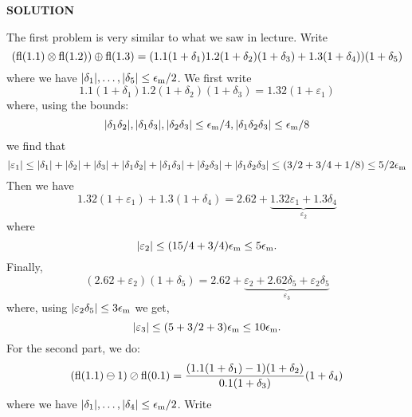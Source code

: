 \documentclass[12pt,a4paper]{article}
\begin{document}
\textbf{SOLUTION}

The first problem is very similar to what we saw in lecture. Write
\[
({\rm fl}(1.1)\ensuremath{\otimes} {\rm fl}(1.2)) \ensuremath{\oplus} {\rm fl}(1.3) = ( 1.1(1 + \ensuremath{\delta}_1)1.2(1+\ensuremath{\delta}_2)(1+\ensuremath{\delta}_3) + 1.3(1+\ensuremath{\delta}_4))(1+\ensuremath{\delta}_5)
\]
where we have $|\ensuremath{\delta}_1|,\ensuremath{\ldots},|\ensuremath{\delta}_5| \ensuremath{\leq} \ensuremath{\epsilon}_{\rm m}/2$. We first write
\[
1.1(1 + \ensuremath{\delta}_1)1.2(1+\ensuremath{\delta}_2)(1+\ensuremath{\delta}_3) = 1.32( 1+ \ensuremath{\varepsilon}_1)
\]
where, using the bounds:
\[
|\ensuremath{\delta}_1\ensuremath{\delta}_2|,|\ensuremath{\delta}_1\ensuremath{\delta}_3|,|\ensuremath{\delta}_2\ensuremath{\delta}_3| \ensuremath{\leq} \ensuremath{\epsilon}_{\rm m}/4, |\ensuremath{\delta}_1\ensuremath{\delta}_2\ensuremath{\delta}_3| \ensuremath{\leq} \ensuremath{\epsilon}_{\rm m}/8
\]
we find that
\[
|\ensuremath{\varepsilon}_1| \ensuremath{\leq} |\ensuremath{\delta}_1| + |\ensuremath{\delta}_2| + |\ensuremath{\delta}_3| + |\ensuremath{\delta}_1\ensuremath{\delta}_2| + |\ensuremath{\delta}_1\ensuremath{\delta}_3| + |\ensuremath{\delta}_2\ensuremath{\delta}_3|+ |\ensuremath{\delta}_1\ensuremath{\delta}_2\ensuremath{\delta}_3| 
     \ensuremath{\leq} (3/2 + 3/4 + 1/8) \ensuremath{\leq} 5/2 \ensuremath{\epsilon}_{\rm m}
\]
Then we have
\[
1.32 (1 + \ensuremath{\varepsilon}_1) + 1.3 (1 + \ensuremath{\delta}_4) = 2.62 + \underbrace{1.32 \ensuremath{\varepsilon}_1 + 1.3\ensuremath{\delta}_4}_{\ensuremath{\varepsilon}_2}
\]
where
\[
|\ensuremath{\varepsilon}_2| \ensuremath{\leq} (15/4 + 3/4) \ensuremath{\epsilon}_{\rm m} \ensuremath{\leq} 5\ensuremath{\epsilon}_{\rm m}.
\]
Finally,
\[
(2.62 + \ensuremath{\varepsilon}_2)(1+\ensuremath{\delta}_5) = 2.62 + \underbrace{\ensuremath{\varepsilon}_2 + 2.62\ensuremath{\delta}_5 + \ensuremath{\varepsilon}_2 \ensuremath{\delta}_5}_{\ensuremath{\varepsilon}_3}
\]
where, using $|\ensuremath{\varepsilon}_2 \ensuremath{\delta}_5| \ensuremath{\leq} 3\ensuremath{\epsilon}_{\rm m}$ we get, 
\[
|\ensuremath{\varepsilon}_3| \ensuremath{\leq} (5 + 3/2 + 3) \ensuremath{\epsilon}_{\rm m}  \ensuremath{\leq} 10\ensuremath{\epsilon}_{\rm m}.
\]
For the second part, we do:
\[
({\rm fl}(1.1) \ensuremath{\ominus} 1) \ensuremath{\oslash} {\rm fl}(0.1) = {(1.1 (1 + \ensuremath{\delta}_1) - 1)(1 + \ensuremath{\delta}_2) \over 0.1 (1 + \ensuremath{\delta}_3)} (1 + \ensuremath{\delta}_4)
\]
where we have $|\ensuremath{\delta}_1|,\ensuremath{\ldots},|\ensuremath{\delta}_4| \ensuremath{\leq} \ensuremath{\epsilon}_{\rm m}/2$. Write
\end{document}
